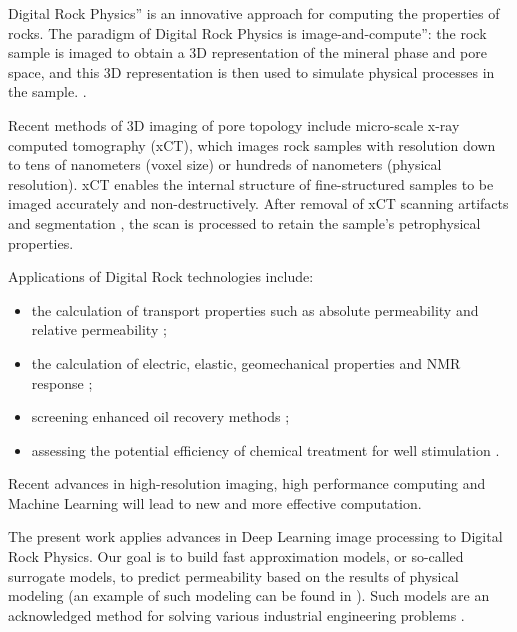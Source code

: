 \documentclass[review]{elsarticle}
\begin{document}
Digital Rock Physics” is an innovative approach for computing the properties of rocks. The paradigm of Digital Rock Physics is image-and-compute”: the rock sample is imaged to obtain a 3D representation of the mineral phase and pore space, and this 3D representation is then used to simulate physical processes in the sample. \cite{chauhan2016processing, koroteev2017method, andra2013digital_1,blunt2013pore}.

Recent methods of 3D imaging of pore topology include micro-scale x-ray computed tomography (\textmu xCT), which images rock samples with resolution down to tens of nanometers (voxel size) or hundreds of nanometers (physical resolution). \textmu xCT enables the internal structure of fine-structured samples to be imaged accurately and non-destructively. After removal of \textmu xCT scanning artifacts and segmentation \cite{chauhan2016processing, koroteev2017method}, the scan is processed to retain the sample’s petrophysical properties.

Applications of Digital Rock technologies include:

\begin{itemize}

\item the calculation of transport properties such as absolute permeability and relative permeability \cite{andra2013digital_2, koroteev2014direct, berg2017industrial, blunt2013pore};

\item the calculation of electric, elastic, geomechanical properties and NMR response \cite{andra2013digital_2, blunt2013pore, evseev2015coupling};

\item screening enhanced oil recovery methods \cite{koroteev2013application};

\item assessing the potential efficiency of chemical treatment for well stimulation \cite{klemin2015digital}.

\end{itemize}

Recent advances in high-resolution imaging, high performance computing and Machine Learning will lead to new and more effective computation.

The present work applies advances in Deep Learning image processing to Digital Rock Physics. Our goal is to build fast approximation models, or so-called surrogate models, to predict permeability based on the results of physical modeling (an example of such modeling can be found in \cite{belyaev2016gtapprox}). Such models are an acknowledged method for solving various industrial engineering problems \cite{grihon2013surrogate}.
\end{document}
